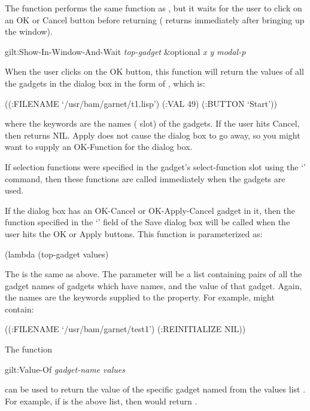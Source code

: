 The function  performs the same function
as , but it waits for the user to click on an OK or
Cancel button before returning ( returns
immediately after bringing up the window).
\begin{programexample}
gilt:Show-In-Window-And-Wait {\it top-gadget} \&optional {\it x y modal-p}\value{function}
\end{programexample}
When the user clicks on the OK button, this function will return the
values of all the gadgets in the dialog box in the form of
, which is:
\begin{programexample}
((:FILENAME `/usr/bam/garnet/t1.lisp') (:VAL 49) (:BUTTON `Start'))
\end{programexample}
where the keywords are the names ( slot) of the gadgets.
If the user hits Cancel, then 
returns NIL.  Apply does not cause the dialog box to go away, so you
might want to supply an OK-Function for the dialog box.

If selection functions were specified in the gadget's select-function
slot using the `' command, then these functions are
called immediately when the gadgets are used.

If the dialog box has an OK-Cancel or OK-Apply-Cancel gadget in it,
then the function
specified in the `' field of the Save dialog
box will be called when the user hits the OK or Apply buttons.  This function
is parameterized as:
\begin{programexample}
(lambda (top-gadget values)
\end{programexample}
The  is the same as above.  The  parameter
will be a list containing pairs of all the gadget names of gadgets
which have names, and
the value of that gadget.  Again, the names are the keywords supplied
to the  property.  For example,  might
contain:
\begin{programexample}
((:FILENAME `/usr/bam/garnet/test1') (:REINITIALIZE NIL))
\end{programexample}

The function
\begin{programexample}
gilt:Value-Of {\it gadget-name values}\value{function}
\end{programexample}
can be used to return the value of the specific gadget named
 from the values list .  For example, if
 is the above list, then  would
return .

